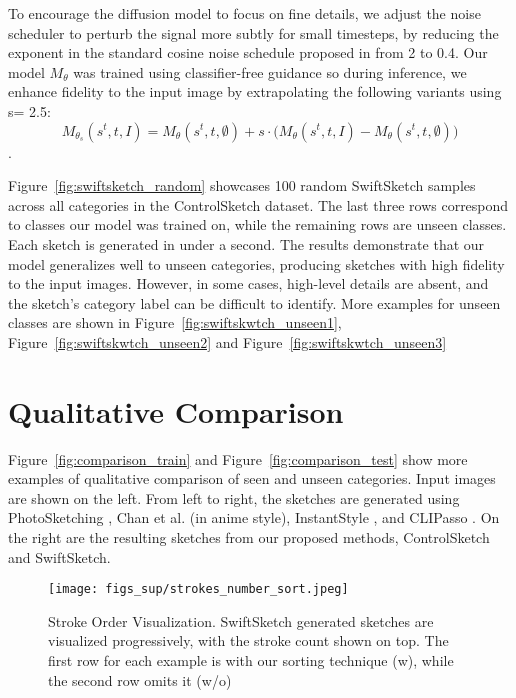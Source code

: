 {To encourage the diffusion model to focus on fine details, we adjust the noise scheduler to perturb the signal more subtly for small timesteps, by reducing the exponent in the standard cosine noise schedule proposed in \cite{Nichol2021ImprovedDD} from 2 to 0.4.
Our model $M_{\theta}$ was trained using classifier-free guidance so during inference, we enhance fidelity to the input image by extrapolating the following variants using s= 2.5:
\begin{equation}
    M_{\theta_s}(s^t, t, I) = M_{\theta}(s^t, t, \emptyset) + s \cdot \big( M_{\theta}(s^t, t, I) - M_{\theta}(s^t, t, \emptyset) \big)
\end{equation}.



Figure~\ref{fig:swiftsketch_random} showcases 100 random SwiftSketch samples across all categories in the ControlSketch dataset. The last three rows correspond to classes our model was trained on, while the remaining rows are unseen classes. Each sketch is generated in under a second. The results demonstrate that our model generalizes well to unseen categories, producing sketches with high fidelity to the input images. However, in some cases, high-level details are absent, and the sketch's category label can be difficult to identify. More examples for unseen classes are shown in Figure~\ref{fig:swiftskwtch_unseen1}, Figure~\ref{fig:swiftskwtch_unseen2} and Figure~\ref{fig:swiftskwtch_unseen3}


\section{Qualitative Comparison}
Figure~\ref{fig:comparison_train} and Figure~\ref{fig:comparison_test}  show more examples of qualitative comparison of seen and unseen categories. Input images are shown on the left. From left to right, the sketches are generated using  PhotoSketching \cite{Li2019PhotoSketchingIC}, Chan et al. \cite{Chan2022LearningTG} (in anime style), InstantStyle \cite{Wang2024InstantStyleFL}, and CLIPasso \cite{vinker2022clipasso}. On the right are the resulting sketches from our proposed methods, ControlSketch and SwiftSketch.


\begin{figure}
    \centering
    \texttt{[image: figs\_sup/strokes\_number\_sort.jpeg]}
    \caption{Stroke Order Visualization. SwiftSketch generated sketches are visualized progressively, with the stroke count shown on top. The first row for each example is with our sorting technique (w), while the second row omits it (w/o)}
    \label{fig:strokes_number_sort}
\end{figure}



}
